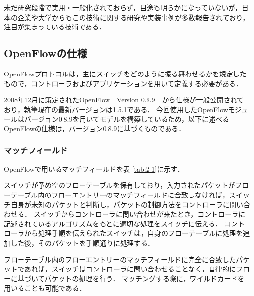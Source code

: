 未だ研究段階で実用・一般化されておらず，目途も明らかになっていないが，日本の企業や大学からもこの技術に関する研究や実装事例が多数報告されており，注目が集まっている技術である．

\subsection{OpenFlowの仕様}

OpenFlowプロトコルは，主にスイッチをどのように振る舞わせるかを規定したもので，コントローラおよびアプリケーションを用いて定義する必要がある．

2008年12月に策定されたOpenFlow　Version 0.8.9\cite{openflow}　から仕様が一般公開されており，執筆現在の最新バージョンは1.5.1である．
今回使用したOpenFlowモジュールはバージョン0.8.9を用いてモデルを構築しているため，以下に述べるOpenFlowの仕様は，バージョン0.8.9に基づくものである．

\subsubsection{マッチフィールド}

OpenFlowで用いるマッチフィールドを表 \ref{tab:2-1}に示す\cite{openflow}．

スイッチが予め空のフローテーブルを保有しており，入力されたパケットがフローテーブル内のフローエントリーのマッチフィールドに合致しなければ，スイッチ自身が未知のパケットと判断し，パケットの制御方法をコントローラに問い合わせる．
スイッチからコントローラに問い合わせが来たとき，コントローラに記述されているアルゴリズムをもとに適切な処理をスイッチに伝える．
コントローラから処理手順を伝えられたスイッチは，自身のフローテーブルに処理を追加した後，そのパケットを手順通りに処理する．

フローテーブル内のフローエントリーのマッチフィールドに完全に合致したパケットであれば，スイッチはコントローラに問い合わせることなく，自律的にフローに基づいてパケットの処理を行う．
マッチングする際に，ワイルドカードを用いることも可能である．


